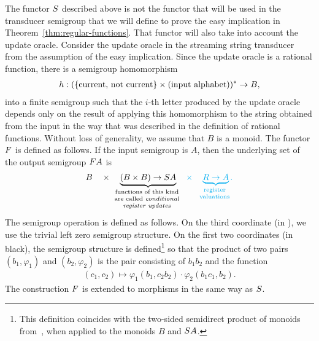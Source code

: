 The functor $\functors$ described above is not the functor that will be used in the transducer semigroup that we will define to prove the easy implication in Theorem~\ref{thm:regular-functions}. That functor will also take into account the update oracle. Consider the update oracle in the streaming string transducer from the assumption of the easy implication. Since the update oracle is a rational function, there is a semigroup homomorphism
\begin{align*}
h : (\{\text{current, not current}\} \times \text{(input alphabet)})^* \to B,
\end{align*}
into a finite semigroup such that the $i$-th letter produced by the update oracle depends only on the result of applying this homomorphism to the string obtained from the input in the way that was described in the definition of rational functions. Without loss of generality, we assume that $B$ is a monoid. The functor $\functor$ is defined as follows. If the input semigroup is $A$, then the underlying set of the output semigroup $\functor A$ is 
\begin{align*}
     B \quad \times \quad \myunderbrace{(B \times B) \to \functors A}{functions of this kind\\ are  called \emph{conditional} \\\emph{register updates}} 
\quad \blue{\times \quad \myunderbrace{R \to A}{register\\ valuations}.}
\end{align*}
The semigroup operation is defined as follows. On the third coordinate (in ), we use the trivial left zero semigroup structure. On the first two coordinates (in black), the semigroup structure is defined\footnote{This definition coincides with the two-sided semidirect product of monoids from~\cite[Section 6]{rhodes1989kernel}, when applied to the monoids $B$ and $\functors A$.} so that the product of two pairs $(b_1,\varphi_1)$ and $(b_2,\varphi_2)$ is  the pair consisting of $b_1 b_2$ and the function  
\begin{align*}
(c_1,c_2)  \mapsto   \varphi_1(b_1,c_2b_2) \cdot \varphi_2(b_1c_1,b_2).
\end{align*}
The construction $\functor$ is extended to morphisms in the same way as $\functors$. 

